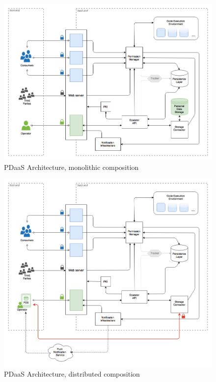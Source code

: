 \documentclass[12pt,english,a4paper,titlepage,cleardoublepage=empty,dottedtoc]{report}
\begin{document}
\begin{figure}
\centering
\includegraphics{./assets/figures/pdaas_component-composition_monolithic.png}
\caption{PDaaS Architecture, monolithic
composition\label{fig:composition-monolithic}}
\end{figure}

\begin{figure}
\centering
\includegraphics{./assets/figures/pdaas_component-composition_distributed.png}
\caption{PDaaS Architecture, distributed
composition\label{fig:composition-distributed}}
\end{figure}
\end{document}
